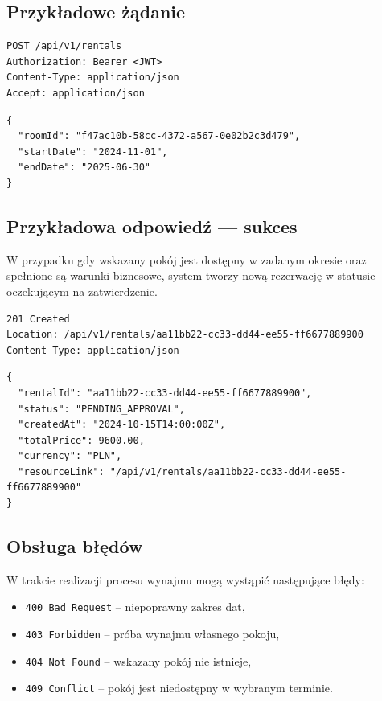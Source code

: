 \documentclass[11pt, a4paper]{article}
\begin{document}
\subsection{Przykładowe żądanie}

\begin{lstlisting}[style=http,caption={Żądanie HTTP — wynajem pokoju}]
POST /api/v1/rentals
Authorization: Bearer <JWT>
Content-Type: application/json
Accept: application/json
\end{lstlisting}

\begin{lstlisting}[style=json,caption={Ciało żądania — wynajem pokoju}]
{
  "roomId": "f47ac10b-58cc-4372-a567-0e02b2c3d479",
  "startDate": "2024-11-01",
  "endDate": "2025-06-30"
}
\end{lstlisting}

\subsection{Przykładowa odpowiedź — sukces}

W przypadku gdy wskazany pokój jest dostępny w zadanym okresie oraz spełnione
są warunki biznesowe, system tworzy nową rezerwację w statusie oczekującym na
zatwierdzenie.

\begin{lstlisting}[style=http,caption={Odpowiedź HTTP — sukces}]
201 Created
Location: /api/v1/rentals/aa11bb22-cc33-dd44-ee55-ff6677889900
Content-Type: application/json
\end{lstlisting}

\begin{lstlisting}[style=json,caption={Ciało odpowiedzi — sukces}]
{
  "rentalId": "aa11bb22-cc33-dd44-ee55-ff6677889900",
  "status": "PENDING_APPROVAL",
  "createdAt": "2024-10-15T14:00:00Z",
  "totalPrice": 9600.00,
  "currency": "PLN",
  "resourceLink": "/api/v1/rentals/aa11bb22-cc33-dd44-ee55-ff6677889900"
}
\end{lstlisting}

\subsection{Obsługa błędów}

W trakcie realizacji procesu wynajmu mogą wystąpić następujące błędy:

\begin{itemize}
    \item \texttt{400 Bad Request} – niepoprawny zakres dat,
    \item \texttt{403 Forbidden} – próba wynajmu własnego pokoju,
    \item \texttt{404 Not Found} – wskazany pokój nie istnieje,
    \item \texttt{409 Conflict} – pokój jest niedostępny w wybranym terminie.
\end{itemize}
\end{document}
